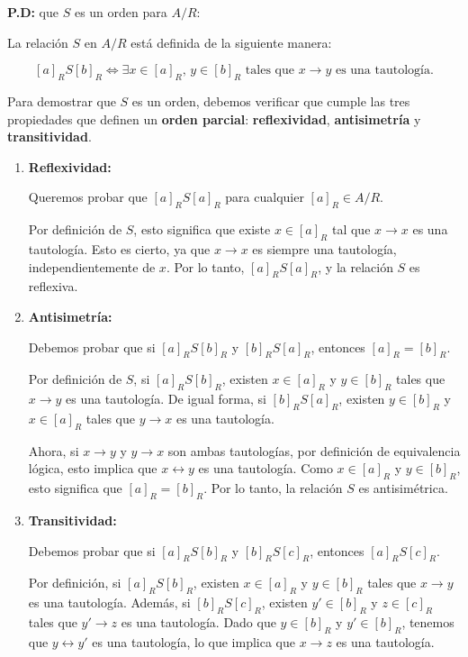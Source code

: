 \begin{solution}
\textbf{P.D:} que \( S \) es un orden para \( A/R \):

La relación \( S \) en \( A/R \) está definida de la siguiente manera:

\[
[a]_R S [b]_R \iff \exists x \in [a]_R, \, y \in [b]_R \text{ tales que } x \rightarrow y \text{ es una tautología}.
\]

Para demostrar que \( S \) es un orden, debemos verificar que cumple las tres propiedades que definen un \textbf{orden parcial}: \textbf{reflexividad}, \textbf{antisimetría} y \textbf{transitividad}.

\begin{enumerate}[label=\arabic*.]
\item \textbf{Reflexividad:}

Queremos probar que \( [a]_R S [a]_R \) para cualquier \( [a]_R \in A/R \).

Por definición de \( S \), esto significa que existe \( x \in [a]_R \) tal que \( x \rightarrow x \) es una tautología. Esto es cierto, ya que \( x \rightarrow x \) es siempre una tautología, independientemente de \( x \). Por lo tanto, \( [a]_R S [a]_R \), y la relación \( S \) es reflexiva.

\item \textbf{Antisimetría:}

Debemos probar que si \( [a]_R S [b]_R \) y \( [b]_R S [a]_R \), entonces \( [a]_R = [b]_R \).

Por definición de \( S \), si \( [a]_R S [b]_R \), existen \( x \in [a]_R \) y \( y \in [b]_R \) tales que \( x \rightarrow y \) es una tautología. De igual forma, si \( [b]_R S [a]_R \), existen \( y \in [b]_R \) y \( x \in [a]_R \) tales que \( y \rightarrow x \) es una tautología. 

Ahora, si \( x \rightarrow y \) y \( y \rightarrow x \) son ambas tautologías, por definición de equivalencia lógica, esto implica que \( x \leftrightarrow y \) es una tautología. Como \( x \in [a]_R \) y \( y \in [b]_R \), esto significa que \( [a]_R = [b]_R \). Por lo tanto, la relación \( S \) es antisimétrica.

\item \textbf{Transitividad:}

Debemos probar que si \( [a]_R S [b]_R \) y \( [b]_R S [c]_R \), entonces \( [a]_R S [c]_R \).

Por definición, si \( [a]_R S [b]_R \), existen \( x \in [a]_R \) y \( y \in [b]_R \) tales que \( x \rightarrow y \) es una tautología. Además, si \( [b]_R S [c]_R \), existen \( y' \in [b]_R \) y \( z \in [c]_R \) tales que \( y' \rightarrow z \) es una tautología. Dado que \( y \in [b]_R \) y \( y' \in [b]_R \), tenemos que \( y \leftrightarrow y' \) es una tautología, lo que implica que \( x \rightarrow z \) es una tautología.


\end{enumerate}
\end{solution}
